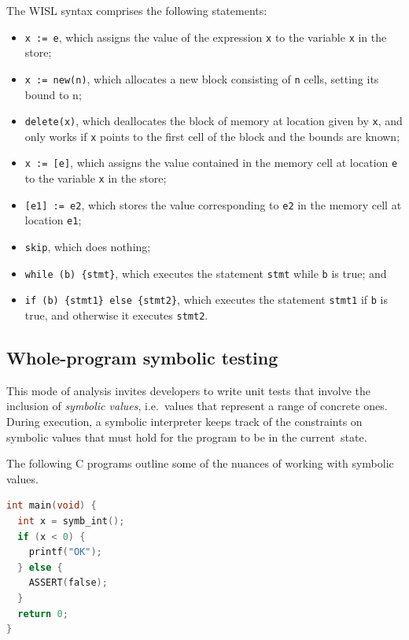 The WISL syntax comprises the following statements:
\begin{itemize}
  \item \texttt{x := e}, which assigns the value of the expression \texttt{x} to the variable \texttt{x} in the store;
  \item \texttt{x := new(n)}, which allocates a new block consisting of \texttt{n} cells, setting its bound to n;
  \item \texttt{delete(x)}, which deallocates the block of memory at location given by \texttt{x}, and only works if \texttt{x} points to the first cell of the block and the bounds are known;
  \item \texttt{x := [e]}, which assigns the value contained in the memory cell at location \texttt{e} to the variable \texttt{x} in the store;
  \item \texttt{[e1] := e2}, which stores the value corresponding to \texttt{e2} in the memory cell at location \texttt{e1};
  \item \texttt{skip}, which does nothing;
  \item \texttt{while (b) \{stmt\}}, which executes the statement \texttt{stmt} while \texttt{b} is true; and
  \item \texttt{if (b) \{stmt1\} else \{stmt2\}}, which executes the statement \texttt{stmt1} if \texttt{b} is true, and otherwise it executes \texttt{stmt2}.
\end{itemize}

\subsection{Whole-program symbolic testing}

This mode of analysis invites developers to write unit tests that involve the
inclusion of \textit{symbolic values}, i.e.\ values that represent a range of
concrete ones. During execution, a symbolic interpreter keeps track of the
constraints on symbolic values that must hold for the program to be in the
current~state.

The following C programs outline some of the nuances of working with symbolic
values.

\begin{lstlisting}[caption={Symbolic execution - basic example}, style=code, language=C]
int main(void) {
  int x = symb_int();
  if (x < 0) {
    printf("OK");
  } else {
    ASSERT(false);
  }
  return 0;
}
\end{lstlisting}

